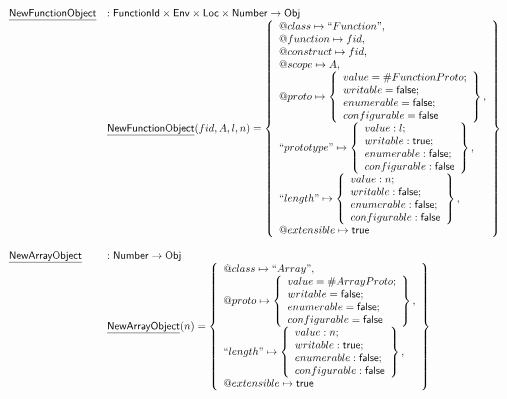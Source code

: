\documentclass{article}
\makeatletter
\newcommand{\SF}[1]{\mbox{\textsf{#1}}}
\newcommand{\Loc}{\SF{Loc}}
\newcommand{\Obj}{\SF{Obj}}
\newcommand{\set}[1]{\left\{\begin{array}{l}#1\end{array}\right\}}
\newcommand{\fid}{\SF{FunctionId}}
\newcommand{\hf}[1]{\underline{\sf #1}}
\newcommand{\varloc}[1]{\##1}
\newcommand{\varprop}[1]{@#1}
\newcommand{\vtrue}{\SF{true}}
\newcommand{\vfalse}{\SF{false}}
\makeatother
\begin{document}
\[\begin{array}{ll}
\hf{NewFunctionObject} & : \fid \times \SF{Env} \times \Loc \times \SF{Number} \rightarrow \Obj \\
& \hf{NewFunctionObject}(fid,A,l,n) = \set{
    \varprop{class}\mapsto ``Function",\\
    \varprop{function}\mapsto fid,\\
    \varprop{construct}\mapsto fid,\\
    \varprop{scope}\mapsto A,\\
    \varprop{proto}\mapsto
    \set{
      value=\varloc{FunctionProto};\\writable=\vfalse;\\
      enumerable=\vfalse;\\configurable=\vfalse
    },\\
    ``prototype"\mapsto \set{
        value:l;\\
        writable:\vtrue;\\
        enumerable:\vfalse;\\
        configurable:\vfalse
      },\\
    ``length"\mapsto \set{
        value:n;\\
        writable:\vfalse;\\
        enumerable:\vfalse;\\
        configurable:\vfalse
      },\\
    \varprop{extensible}\mapsto \vtrue
}\\\\
\hf{NewArrayObject} & : \SF{Number} \rightarrow \Obj \\
& \hf{NewArrayObject}(n) = \set{
    \varprop{class}\mapsto ``Array",\\
    \varprop{proto}\mapsto 
    \set{
      value=\varloc{ArrayProto};\\writable=\vfalse;\\
      enumerable=\vfalse;\\configurable=\vfalse
    },\\
   ``length"\mapsto \set{
       value:n;\\
       writable:\vtrue;\\
       enumerable:\vfalse;\\
       configurable:\vfalse
     },\\
    \varprop{extensible}\mapsto \vtrue
}\\\\

\end{array}
\]
\end{document}

